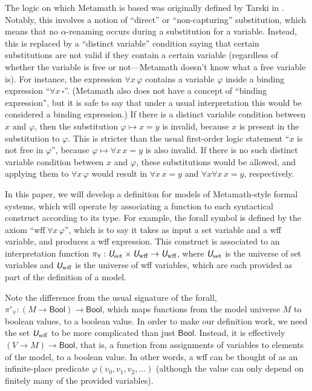 \documentclass[runningheads,a4paper]{llncs}
\newcommand{\uv}{\textit{\textsf{U}}} %
\newcommand{\vph}{\varphi}
\newcommand{\bool}{\textsf{Bool}}
\begin{document}
The logic on which Metamath is based was originally defined by Tarski in \cite{tarski}. Notably, this involves a notion of ``direct'' or ``non-capturing'' substitution, which means that no $\alpha$-renaming occurs during a substitution for a variable. Instead, this is replaced by a ``distinct variable'' condition saying that certain substitutions are not valid if they contain a certain variable (regardless of whether the variable is free or not---Metamath doesn't know what a free variable is). For instance, the expression $\forall x\,\vph$ contains a variable $\vph$ inside a binding expression ``$\forall x\,\square$''. (Metamath also does not have a concept of ``binding expression'', but it is safe to say that under a usual interpretation this would be considered a binding expression.) If there is a distinct variable condition between $x$ and $\vph$, then the substitution $\vph\mapsto x=y$ is invalid, because $x$ is present in the substitution to $\vph$. This is stricter than the usual first-order logic statement ``$x$ is not free in $\vph$'', because $\vph\mapsto \forall x\,x=y$ is also invalid. If there is no such distinct variable condition between $x$ and $\vph$, these substitutions would be allowed, and applying them to $\forall x\,\vph$ would result in $\forall x\,x=y$ and  $\forall x\forall x\,x=y$, respectively.  

In this paper, we will develop a definition for models of Metamath-style formal systems, which will operate by associating a function to each syntactical construct according to its type. For example, the forall symbol is defined by the axiom ``$\textrm{wff}\ \forall x\,\vph$'', which is to say it takes as input a set variable and a wff variable, and produces a wff expression. This construct is associated to an interpretation function $\pi_\forall:\uv_\textrm{set}\times\uv_\textrm{wff}\to\uv_\textrm{wff}$, where $\uv_\textrm{set}$ is the universe of set variables and $\uv_\textrm{wff}$ is the universe of wff variables, which are each provided as part of the definition of a model.

Note the difference from the usual signature of the forall, $\pi'_\forall:(M\to\bool)\to\bool$, which maps functions from the model universe $M$ to boolean values, to a boolean value. In order to make our definition work, we need the set $\uv_\textrm{wff}$ to be more complicated than just $\bool$. Instead, it is effectively $(V\to M)\to\bool$, that is, a function from assignments of variables to elements of the model, to a boolean value. In other words, a wff can be thought of as an infinite-place predicate $\vph(v_0,v_1,v_2,\dots)$ (although the value can only depend on finitely many of the provided variables).
\end{document}
